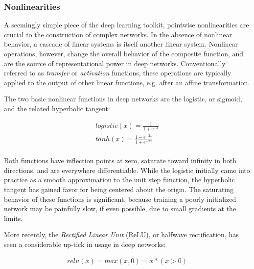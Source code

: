 

\subsubsection{Nonlinearities}

A seemingly simple piece of the deep learning toolkit, pointwise nonlinearities are crucial to the construction of complex networks.
In the absence of nonlinear behavior, a cascade of linear systems is itself another linear system.
Nonlinear operations, however, change the overall behavior of the composite function, and are the source of representational power in deep networks.
Conventionally referred to as \emph{transfer} or \emph{activation} functions, these operations are typically applied to the output of other linear functions, e.g. after an affine transformation.

The two basic nonlinear functions in deep networks are the logistic, or sigmoid, and the related hyperbolic tangent:

\begin{align*}
  logistic(x) = \frac{1}{1 + \mathrm{e}^{-x}} \\
  tanh(x) = \frac{1 - \mathrm{e}^{-2x}} {1 + \mathrm{e}^{-2x}} \\
\end{align*}

Both functions have inflection points at zero, saturate toward infinity in both directions, and are everywhere differentiable.
While the logistic initially came into practice as a smooth approximation to the unit step function, the hyperbolic tangent has gained favor for being centered about the origin.
The saturating behavior of these functions is significant, because training a poorly initialized network may be painfully slow, if even possible, due to small gradients at the limits.

More recently, the \emph{Rectified Linear Unit} (ReLU), or halfwave rectification, has seen a considerable up-tick in usage in deep networks:

\begin{align*}
  relu(x) = max(x, 0) = x * (x > 0)\\
\end{align*}

